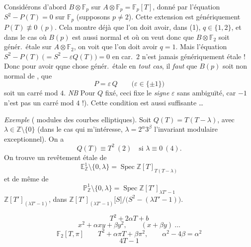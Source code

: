 \documentclass[11pt,a4paper]{article}
\begin{document}
Considérons d'abord  $B \otimes \mathbb{F}_p$ sur
$A \otimes \mathbb{F}_p = \mathbb{F}_p[T]$, donné par l'équation
$S^2 - P(T) = 0$ \struck{\ill{}} sur $\mathbb{F}_p$
(supposons $p \neq 2$). Cette extension est
génériquement \struck{\ill{}}  
$P(T) \not\equiv 0 \ (p)$. Cela montre déjà que \struck{\ill{}} l'on doit avoir,
dans (1), $q \in \{1, 2\}$, et dans le cas où $B(p)$ est aussi normal
 et où on veut donc que $B \otimes \mathbb{F}_2$ soit
génér.\ étale sur $A \otimes \mathbb{F}_2$, on voit que l'on doit avoir
$q = 1$. Mais l'équation $S^2 - P(T)\ \bigl(= S^2 - \varepsilon Q(T)\bigr) = 0$ en
car.\ $2$ n'est jamais génériquement étale ! Donc  pour
avoir qqne chose génér.\ étale en \emph{tout cas}, il
\emph{faut} que $B(p)$ soit non normal de , que
\[
P = \varepsilon\, Q \qquad \bigl(\varepsilon \in \{\pm 1\}\bigr)
\]
soit un carré mod $4$. \emph{NB} Pour $Q$ fixé, ceci fixe le
\emph{signe} $\varepsilon$ sans ambiguïté, car $-1$ n'est pas un
carré mod $4$ !). Cette condition est aussi suffisante \ldots
{}

\emph{Exemple} ( modules des courbes elliptiques).
Soit $Q(T) = T(T - \lambda)$, avec $\lambda \in \mathbb{Z} \setminus \{0\}$
(dans le cas qui m'intéresse, $\lambda = 2^\alpha 3^\beta$ l'invariant modulaire
exceptionnel). On a
\[
Q(T) \equiv T^2 \ (2) \quad \text{si } \lambda \equiv 0 \ (4).
\]
On trouve un revêtement étale de
\[
\mathbb{E}^1_{\mathbb{Z}} \setminus \{0, \lambda\} = \operatorname{Spec} \mathbb{Z}[T]_{T(T-\lambda)}
\]
et de même de
\[
\mathbb{P}^1_{\mathbb{Z}} \setminus \{0, \lambda\} = \operatorname{Spec} \mathbb{Z}[T']_{\lambda T' - 1}
\]
 $\mathbb{Z}[T']_{(\lambda T' - 1)}$, dans
$\mathbb{Z}[T']_{(\lambda T' - 1)}\bigl[S\bigr]/\bigl(S^2 - (\lambda T' - 1)\bigr)$.

\[
T^2 + 2\alpha T + b
\]
\[
x^2 + \alpha x y + \beta y^2, \qquad (x + \beta y)\ \ldots
\]
\[
\mathbb{F}_2[T, \pi] \qquad T^2 + \alpha \pi T + \beta \pi^2, \qquad
\alpha^2 - 4\beta = \alpha^2
\]
\[
4T - 1
\]
\end{document}
